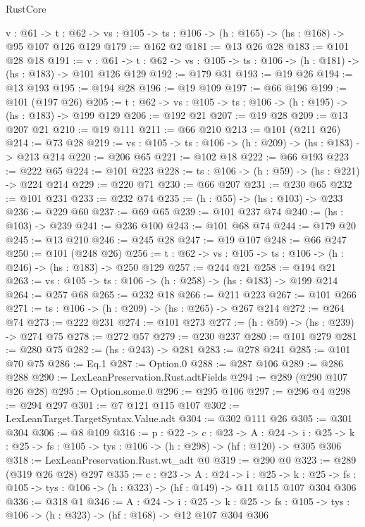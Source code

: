 \begin{lexlean}{RustCore}
\begin{coremodule}
  {v : @61} ->
  {t : @62} -> {vs : @105} -> {ts : @106} -> (h : @165) -> (hs : @168) -> @95 @107 @126 @129
@179 := @162 @2
@181 := @13 @26 @28
@183 := @101 @28 @18
@191 := {v : @61} ->
  {t : @62} -> {vs : @105} -> {ts : @106} -> (h : @181) -> (hs : @183) -> @101 @126 @129
@192 := @179 @31
@193 := @19 @26
@194 := @13 @193
@195 := @194 @28
@196 := @19 @109
@197 := @66 @196
@199 := @101 (@197 @26)
@205 := {t : @62} -> {vs : @105} -> {ts : @106} -> (h : @195) -> (hs : @183) -> @199 @129
@206 := @192 @21
@207 := @19 @28
@209 := @13 @207 @21
@210 := @19 @111
@211 := @66 @210
@213 := @101 (@211 @26)
@214 := @73 @28
@219 := {vs : @105} -> {ts : @106} -> (h : @209) -> (hs : @183) -> @213 @214
@220 := @206 @65
@221 := @102 @18
@222 := @66 @193
@223 := @222 @65
@224 := @101 @223
@228 := {ts : @106} -> (h : @59) -> (hs : @221) -> @224 @214
@229 := @220 @71
@230 := @66 @207
@231 := @230 @65
@232 := @101 @231
@233 := @232 @74
@235 := (h : @55) -> (hs : @103) -> @233
@236 := @229 @60
@237 := @69 @65
@239 := @101 @237 @74
@240 := (hs : @103) -> @239
@241 := @236 @100
@243 := @101 @68 @74
@244 := @179 @20
@245 := @13 @210
@246 := @245 @28
@247 := @19 @107
@248 := @66 @247
@250 := @101 (@248 @26)
@256 := {t : @62} -> {vs : @105} -> {ts : @106} -> (h : @246) -> (hs : @183) -> @250 @129
@257 := @244 @21
@258 := @194 @21
@263 := {vs : @105} -> {ts : @106} -> (h : @258) -> (hs : @183) -> @199 @214
@264 := @257 @68
@265 := @232 @18
@266 := @211 @223
@267 := @101 @266
@271 := {ts : @106} -> (h : @209) -> (hs : @265) -> @267 @214
@272 := @264 @74
@273 := @222 @231
@274 := @101 @273
@277 := (h : @59) -> (hs : @239) -> @274 @75
@278 := @272 @57
@279 := @230 @237
@280 := @101 @279
@281 := @280 @75
@282 := (hs : @243) -> @281
@283 := @278 @241
@285 := @101 @70 @75
@286 := Eq.{1}
@287 := Option.{0}
@288 := @287 @106
@289 := @286 @288
@290 := LexLeanPreservation.Rust.adtFields
@294 := @289 (@290 @107 @26 @28)
@295 := Option.some.{0}
@296 := @295 @106
@297 := @296 @4
@298 := @294 @297
@301 := @7 @121 @115 @107
@302 := LexLeanTarget.TargetSyntax.Value.adt
@304 := @302 @111 @26
@305 := @301 @304
@306 := @8 @109
@316 := {p : @22} ->
  {c : @23} ->
  {A : @24} ->
  {i : @25} -> {k : @25} -> {fs : @105} -> {tys : @106} -> (h : @298) -> (hf : @120) -> @305 @306
@318 := LexLeanPreservation.Rust.wt_adt @0
@319 := @290 @0
@323 := @289 (@319 @26 @28) @297
@335 := {c : @23} ->
  {A : @24} ->
  {i : @25} ->
  {k : @25} -> {fs : @105} -> {tys : @106} -> (h : @323) -> (hf : @149) -> @11 @115 @107 @304 @306
@336 := @318 @1
@346 := {A : @24} ->
  {i : @25} ->
  {k : @25} -> {fs : @105} -> {tys : @106} -> (h : @323) -> (hf : @168) -> @12 @107 @304 @306

\end{coremodule}
\end{lexlean}
